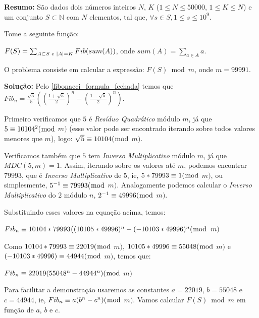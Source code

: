 \textbf{Resumo:}
São dados dois números inteiros $N$, $K$ ($1 \leq N \leq 50000$, $1 \leq K \leq N$) e um conjunto $S \subset \mathbb{N}$ com $N$ elementos, tal que, $\forall s \in S, 1 \leq s \leq 10^9$.

Tome a seguinte função:

$F(S) = \sum_{A \subset S \hspace{1mm} e\hspace{1mm} |A| = K}^{} Fib(sum(A))$, onde $sum(A) = \sum_{a \in A}a$. %

O problema consiste em calcular a expressão:  
$F(S) \bmod m$, onde $m = 99991$.
\newline

\textbf{Solução:}
Pelo \autoref{fibonacci_formula_fechada} temos que $Fib_n = \frac{\sqrt{5}}{5}((\frac{1+\sqrt{5}}{2})^n - (\frac{1-\sqrt{5}}{2})^n)$.

Primeiro verificamos que $5$ é \textit{Resíduo Quadrático} módulo $m$, já que $5 \equiv 10104^2(\bmod$ $m)$ (esse valor pode
ser encontrado iterando sobre todos valores menores que $m$), logo: $\sqrt{5} \equiv 10104(\bmod$ $m)$.

Verificamos também que $5$ tem \textit{Inverso Multiplicativo} módulo $m$, já que $MDC(5,m)=1$. Assim, iterando sobre os valores até $m$, podemos encontrar $79993$, que é \textit{Inverso Multiplicativo} de $5$, ie, $5 * 79993 \equiv 1(\bmod$ $m)$, ou simplesmente, $5^{-1} \equiv 79993(\bmod$ $m)$.
Analogamente podemos calcular o \textit{Inverso Multiplicativo} do $2$ módulo $n$, $2^{-1} \equiv 49996(\bmod$ $m)$.

Substituindo esses valores na equação acima, temos:
\newline

$Fib_n \equiv 10104*79993 \big( (10105*49996)^n - (-10103*49996)^n (\bmod$ $m)$ 
\newline

Como $10104*79993 \equiv 22019 (\bmod$ $m)$, $10105*49996 \equiv 55048 (\bmod$ $m)$ e $(-10103*49996) \equiv 44944 (\bmod$ $m)$, temos que:
\newline

$Fib_n\equiv 22019(55048^n - 44944^n)(\bmod$ $m)$
\newline

Para facilitar a demonstração usaremos as constantes $a=22019$, $b=55048$ e $c=44944$, ie, $Fib_n \equiv a(b^n-c^n)(\bmod$ $m)$. 
Vamos calcular $F(S) \bmod m$ em função de $a$, $b$ e $c$.
\newline

